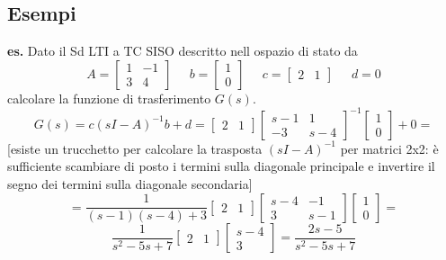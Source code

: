\subsection{Esempi}
\textbf{es.}  Dato il Sd LTI a TC SISO descritto nell ospazio di stato da 
\[
    A=\left[\begin{matrix}
        1 & -1\\
        3 & 4
    \end{matrix}\right] \;\;\;\;\; b = \left[\begin{matrix}
        1\\0
    \end{matrix}\right] \;\;\;\;\; c= \left[\begin{matrix}
        2 &1
    \end{matrix}\right] \;\;\;\;\;d=0
\]
calcolare la funzione di trasferimento $G(s)$.
\[
    G(s) = c (sI-A)^{-1} b +d = \left[\begin{matrix}
        2 &1
    \end{matrix}\right]\left[\begin{matrix}
        s-1&1\\
        -3 & s-4
    \end{matrix}\right]^{-1} \left[\begin{matrix}
        1\\0
    \end{matrix}\right]+0 = 
\]
[esiste un trucchetto per calcolare la trasposta $(sI-A)^{-1}$ per matrici 2x2: è sufficiente scambiare di posto i termini sulla diagonale principale e invertire il segno dei termini sulla diagonale secondaria]
\[
    = \frac{1}{(s-1)(s-4) +3} \left[\begin{matrix}
        2&1
    \end{matrix}\right]\left[\begin{matrix}
        s-4 & -1\\
        3 & s-1
    \end{matrix}\right]\left[\begin{matrix}
        1\\0
    \end{matrix}\right]=
\]
\[
    \frac{1}{s^2 -5s +7} \left[\begin{matrix}
        2&1
    \end{matrix}\right]\left[\begin{matrix}
        s-4\\3
    \end{matrix}\right] = \frac{2s -5 }{s^2 -5s +7}
\]